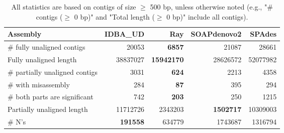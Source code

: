 \documentclass[12pt,a4paper]{article}
\begin{document}
\begin{table}[ht]
\begin{center}
\caption{All statistics are based on contigs of size $\geq$ 500 bp, unless otherwise noted (e.g., "\# contigs ($\geq$ 0 bp)" and "Total length ($\geq$ 0 bp)" include all contigs).}
\begin{tabular}{|l*{4}{|r}|}
\hline
Assembly & IDBA\_UD & Ray & SOAPdenovo2 & SPAdes \\ \hline
\# fully unaligned contigs & 20053 & {\bf 6857} & 21087 & 28661 \\ \hline
Fully unaligned length & 38837027 & {\bf 15942170} & 28626572 & 52077982 \\ \hline
\# partially unaligned contigs & 3031 & {\bf 624} & 2213 & 4358 \\ \hline
\hspace{5mm}\# with misassembly & 284 & {\bf 87} & 395 & 294 \\ \hline
\hspace{5mm}\# both parts are significant & 742 & {\bf 203} & 250 & 1215 \\ \hline
Partially unaligned length & 11712726 & 2343203 & {\bf 1502717} & 10309003 \\ \hline
\# N's & {\bf 191558} & 634779 & 1743687 & 1316794 \\ \hline
\end{tabular}
\end{center}
\end{table}
\end{document}
